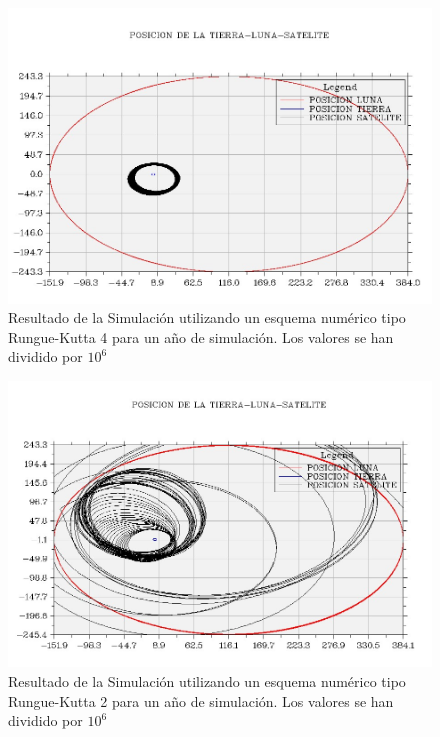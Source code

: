 \documentclass[11pt,singlespacing,liststotoc,headsepline,a4paper]{article}
\begin{document}
\begin{figure}[H]
	\centering
	\includegraphics[width=1\textwidth]{TLS1A_RG4.jpg}
	\caption{Resultado de la Simulación utilizando un esquema numérico tipo Rungue-Kutta 4 para un año de simulación.  Los valores se han dividido por $10^{6}$}
	\label{TLS1A_RG4}
\end{figure}

\begin{figure}[H]
	\centering
	\includegraphics[width=1\textwidth]{TLS1A_RG2.jpg}
	\caption{Resultado de la Simulación utilizando un esquema numérico tipo Rungue-Kutta 2 para un año de simulación.  Los valores se han dividido por $10^{6}$}
	\label{TLS1A_RG2}
\end{figure}
\end{document}
